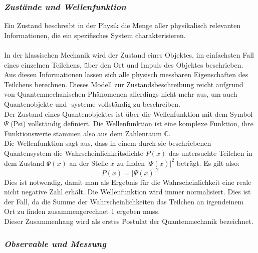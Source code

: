 \subsubsection*{\textit{Zustände und Wellenfunktion}}

Ein Zustand beschreibt in der Physik die Menge aller physikalisch relevanten Informationen, die ein spezifisches System charakterisieren.\\
\\
In der klassischen Mechanik wird der Zustand eines Objektes, im einfachsten Fall eines einzelnen Teilchens, über den Ort und Impuls des Objektes beschrieben. Aus diesen Informationen lassen sich alle physisch messbaren Eigenschaften des Teilchens berechnen. Dieses Modell zur Zustandsbeschreibung reicht aufgrund von Quantenmechanischen Phänomenen allerdings nicht mehr aus, um auch Quantenobjekte und -systeme vollständig zu beschreiben.\\

Der Zustand eines Quantenobjektes ist über die Wellenfunktion mit dem Symbol $\Psi$ (Psi) vollständig definiert. Die Wellenfunktion ist eine komplexe Funktion, ihre Funktionswerte stammen also aus dem Zahlenraum $\mathbb{C}$.\\
Die Wellenfunktion sagt aus, dass in einem durch sie beschriebenen Quantensystem die Wahrscheinlichkeitsdichte $P(x)$ das untersuchte Teilchen in dem Zustand $\Psi(x)$ an der Stelle $x$ zu finden $|\Psi(x)|^2$ beträgt. Es gilt also:\\
\begin{equation*}
P(x) = |\Psi(x)|^2
\end{equation*}
Dies ist notwendig, damit man als Ergebnis für die Wahrscheinlichkeit eine reale nicht negative Zahl erhält. Die Wellenfunktion wird immer normalisiert. Dies ist der Fall, da die Summe der Wahrscheinlichkeiten das Teilchen an irgendeinem Ort zu finden zusammengerechnet 1 ergeben muss.\\
Dieser Zusammenhang wird als erstes Postulat der Quantenmechanik bezeichnet.

\subsubsection*{\textit{Observable und Messung}}

